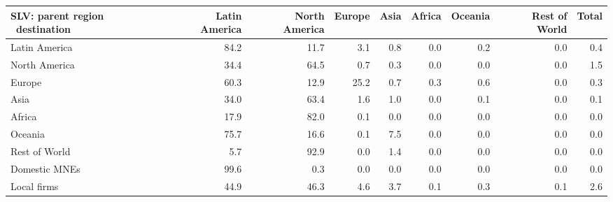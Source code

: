 \begin{tabular}{lrrrrrrrr}
\toprule
SLV: parent region \ destination & Latin America & North America & Europe & Asia & Africa & Oceania & Rest of World & Total \\
\midrule
Latin America & 84.2 & 11.7 & 3.1 & 0.8 & 0.0 & 0.2 & 0.0 & 0.4 \\
North America & 34.4 & 64.5 & 0.7 & 0.3 & 0.0 & 0.0 & 0.0 & 1.5 \\
Europe & 60.3 & 12.9 & 25.2 & 0.7 & 0.3 & 0.6 & 0.0 & 0.3 \\
Asia & 34.0 & 63.4 & 1.6 & 1.0 & 0.0 & 0.1 & 0.0 & 0.1 \\
Africa & 17.9 & 82.0 & 0.1 & 0.0 & 0.0 & 0.0 & 0.0 & 0.0 \\
Oceania & 75.7 & 16.6 & 0.1 & 7.5 & 0.0 & 0.0 & 0.0 & 0.0 \\
Rest of World & 5.7 & 92.9 & 0.0 & 1.4 & 0.0 & 0.0 & 0.0 & 0.0 \\
Domestic MNEs & 99.6 & 0.3 & 0.0 & 0.0 & 0.0 & 0.0 & 0.0 & 0.0 \\
Local firms & 44.9 & 46.3 & 4.6 & 3.7 & 0.1 & 0.3 & 0.1 & 2.6 \\
\bottomrule
\end{tabular}
